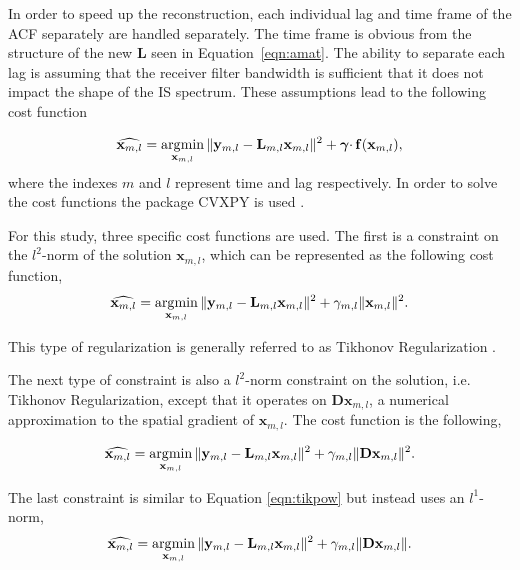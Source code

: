 In order to speed up the reconstruction, each individual lag and time frame of the ACF separately are handled separately. The time frame is obvious from the structure of the new $\mathbf{L}$ seen in Equation~\ref{eqn:amat}. The ability to separate each lag is assuming that the receiver filter bandwidth is sufficient that it does not impact the shape of the IS spectrum. These assumptions lead to the following cost function

\begin{equation}
\label{eqn:lstsqrsvecdblag}
\widehat{\mathbf{x}_{m,l}} = \operatorname*{\arg\!\min}\limits_{\mathbf{x}_{m,l}} \|\mathbf{y}_{m,l} -\mathbf{L}_{m,l}\mathbf{x}_{m,l} \|^2 + \boldsymbol{\gamma}\cdotp\mathbf{f}(\mathbf{x}_{m,l}),
\end{equation}
\noindent where the indexes $m$ and $l$ represent time and lag respectively. In order to solve the cost functions the package CVXPY is used \citep{cvxpy}.

For this study, three specific cost functions are used. The first is a constraint on the $l^2$-norm of the solution $\mathbf{x}_{m,l}$, which can be represented as the following cost function,
\begin{equation}
\label{eqn:tikpow}
\widehat{\mathbf{x}_{m,l}} = \operatorname*{\arg\!\min}\limits_{\mathbf{x}_{m,l}} \|\mathbf{y}_{m,l} -\mathbf{L}_{m,l}\mathbf{x}_{m,l} \|^2 +\gamma_{m,l} \|\mathbf{x}_{m,l}\|^2.
\end{equation}

\noindent This type of regularization is generally referred to as Tikhonov Regularization \citep{Karl:2005jy}.

The next type of constraint is also a $l^2$-norm constraint on the solution, i.e. Tikhonov Regularization, except that it operates on $\mathbf{D}\mathbf{x}_{m,l}$, a numerical approximation to the spatial gradient of $\mathbf{x}_{m,l}$. The cost function is the following,

\begin{equation}
\label{eqn:tikD}
\widehat{\mathbf{x}_{m,l}} = \operatorname*{\arg\!\min}\limits_{\mathbf{x}_{m,l}} \|\mathbf{y}_{m,l} -\mathbf{L}_{m,l}\mathbf{x}_{m,l} \|^2 + \gamma_{m,l} \|\mathbf{D}\mathbf{x}_{m,l}\|^2.
\end{equation}

\noindent The last constraint is similar to Equation \ref{eqn:tikpow} but instead uses an $l^1$-norm,
\begin{equation}
\label{eqn:tv}
\widehat{\mathbf{x}_{m,l}} = \operatorname*{\arg\!\min}\limits_{\mathbf{x}_{m,l}} \|\mathbf{y}_{m,l} -\mathbf{L}_{m,l}\mathbf{x}_{m,l} \|^2 + \gamma_{m,l} \|\mathbf{D}\mathbf{x}_{m,l}\|.
\end{equation} 

